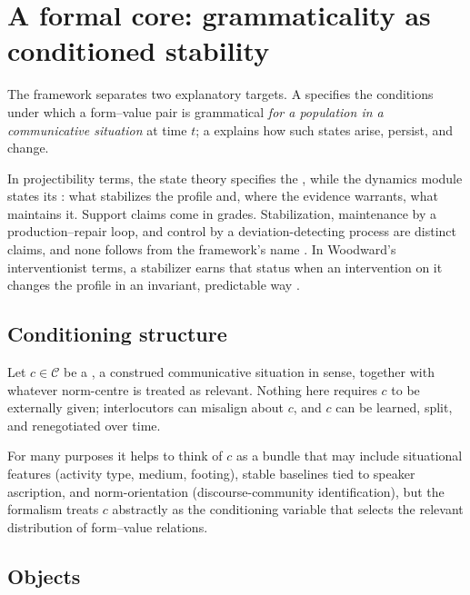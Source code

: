 \section{A formal core: grammaticality as conditioned stability}
\label{sec:formalism}

The framework separates two explanatory targets. A  specifies
the conditions under which a form--value pair is grammatical \emph{for a
population in a communicative situation} at time $t$; a 
explains how such states arise, persist, and change.

In projectibility terms, the state theory specifies the , while
the dynamics module states its : what stabilizes the profile and,
where the evidence warrants, what maintains it. Support claims come in grades.
Stabilization, maintenance by a production--repair loop, and control by a
deviation-detecting process are distinct claims, and none follows from the
framework's name \autocite{reynolds2026kindsProjectibilityProfiles,
reynolds2026notEveryStableCluster}.
In Woodward's interventionist terms, a stabilizer earns that status when an intervention on it changes the profile in an invariant, predictable way \autocite{woodward2003MakingThingsHappen, woodward2001}.

\subsection{Conditioning structure}
\label{sec:conditioning}

Let $c\in\mathcal{C}$ be a , a construed communicative situation in  sense, together with whatever norm-centre is treated as relevant. Nothing here requires $c$ to be externally given; interlocutors can misalign about $c$, and $c$ can be learned, split, and renegotiated over time.

For many purposes it helps to think of $c$ as a bundle that may include situational features (activity type, medium, footing), stable baselines tied to speaker ascription, and norm-orientation (discourse-community identification), but the formalism treats $c$ abstractly as the conditioning variable that selects the relevant distribution of form--value relations.

\subsection{Objects}
\label{sec:objects}

